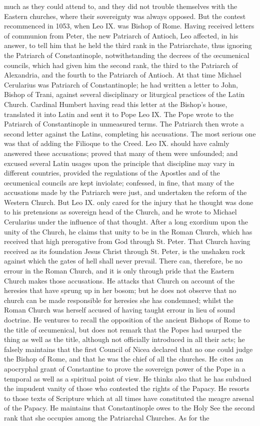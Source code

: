 much as they could attend to, and they did not trouble themselves with the Eastern churches, where their sovereignty was always opposed. But the contest recommenced in 1053, when Leo IX. was Bishop of Rome. Having received letters of communion from Peter, the new Patriarch of Antioch, Leo affected, in his answer, to tell him that he held the third rank in the Patriarchate, thus ignoring the Patriarch of Constantinople, notwithstanding the decrees of the œcumenical councils, which had given him the second rank, the third to the Patriarch of Alexandria, and the fourth to the Patriarch of Antioch. At that time Michael Cerularius was Patriarch of Constantinople; he had written a letter to John, Bishop of Trani, against several disciplinary or liturgical practices of the Latin Church. Cardinal Humbert having read this letter at the Bishop's house, translated it into Latin and sent it to Pope Leo IX. The Pope wrote to the Patriarch of Constantinople in unmeasured terms. The Patriarch then wrote a second letter against the Latins, completing his accusations. The most serious one was that of adding the Filioque to the Creed. Leo IX. should have calmly answered these accusations; proved that many of them were unfounded; and excused several Latin usages upon the principle that discipline may vary in different countries, provided the regulations of the Apostles and of the œcumenical councils are kept inviolate; confessed, in fine, that many of the accusations made by the Patriarch were just, and undertaken the reform of the Western Church. But Leo IX. only cared for the injury that he thought was done to his pretensions as sovereign head of the Church, and he wrote to Michael Cerularius under the influence of that thought. After a long exordium upon the unity of the Church, he claims that unity to be in the Roman Church, which has received that high prerogative from God through St. Peter. That Church having received as its foundation Jesus Christ through St. Peter, is the unshaken rock against which the gates of hell shall never prevail. There can, therefore, be no errour in the Roman Church, and it is only through pride that the Eastern Church makes those accusations. He attacks that Church on account of the heresies that have sprung up in her bosom; but he does not observe that no church can be made responsible for heresies she has condemned; whilst the Roman Church was herself accused of having taught errour in lieu of sound doctrine. He ventures to recall the opposition of the ancient Bishops of Rome to the title of œcumenical, but does not remark that the Popes had usurped the thing as well as the title, although not officially introduced in all their acts; he falsely maintains that the first Council of Nicea declared that no one could judge the Bishop of Rome, and that he was the chief of all the churches. He cites an apocryphal grant of Constantine to prove the sovereign power of the Pope in a temporal as well as a spiritual point of view. He thinks also that he has subdued the impudent vanity of those who contested the rights of the Papacy. He resorts to those texts of Scripture which at all times have constituted the meagre arsenal of the Papacy. He maintains that Constantinople owes to the Holy See the second rank that she occupies among the Patriarchal Churches. As for the 